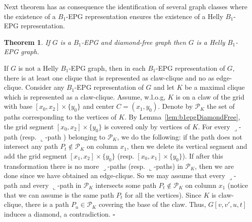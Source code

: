 \documentclass[9pt]{entcs}
\newtheorem{teo}[thm]{Theorem}%
\begin{document}


Next theorem has as consequence the identification of several graph classes where the existence of a $B_1$-EPG representation ensures the existence of a Helly $B_1$-EPG representation.


\begin{teo} \label{lem:b1DiamondFree}
 If $G$ is a $B_1$-EPG and diamond-free graph then $G$ is a Helly $B_1$-EPG graph.
 \end{teo}

\begin{pf}
If $G$ is not a Helly $B_1$-EPG graph, then in each $B_1$-EPG representation of $G$, there is at least one clique that is represented as claw-clique and no as edge-clique.  Consider any $B_1$-EPG  representation of $G$  and let $K$ be a maximal clique  which is represented as a claw-clique. Assume, w.l.o.g,  $K$ is on a claw of the grid with base $[x_0, x_2]\times\{y_0\}$ and center $C = (x_1, y_0)$. Denote by  $\mathcal{P}_K$ the set of paths corresponding to the vertices of $K$. 
 By Lemma~\ref{lem:b1epgDiamondFree},  %
the grid segment $[x_0, x_2]\times\{y_0\}$ is covered only by vertices of $K$. %
 For every ${\displaystyle \lrcorner}$-path %
 (resp. ${\displaystyle \llcorner}$-path 
 ) belonging to $\mathcal{P}_K$, we do the following: if %
 the path does not intersect any path $P_t \notin\mathcal{P}_K$ on column $x_1$, then we delete its vertical segment and add the grid segment $[x_1, x_2]\times\{y_0\}$ (resp. $[x_0, x_1]\times\{y_0\}$). If after this transformation there is no more ${\displaystyle \lrcorner}$-paths (resp. ${\displaystyle \llcorner}$-paths) in $\mathcal{P}_K$, then we are done since we have obtained an edge-clique. So we may assume that
 every ${\displaystyle \lrcorner}$-path   and every ${\displaystyle \llcorner}$-path  in $ \mathcal{P}_K$ intersects some path $P_t \notin \mathcal{P}_K$   on column $x_1$ (notice that we can assume is the same path $P_t$ for all the vertices). Since  $K$ is claw-clique,  there is a path $P_u \in \mathcal{P}_K$ covering the base of the claw. Thus, $G[v, v', u, t]$ induces a diamond,  a contradiction. $\square$


\end{pf}
\end{document}
